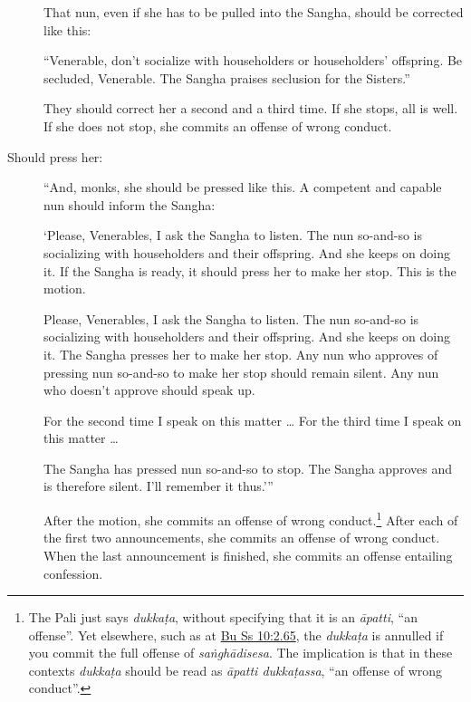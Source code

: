 \documentclass[12pt,openany]{book}%
\begin{document}
\begin{description}
That nun, even if she has to be pulled into the Sangha, should be corrected like this: 

“Venerable, don’t socialize with householders or householders’ offspring. Be secluded, Venerable. The Sangha praises seclusion for the Sisters.” 

They should correct her a second and a third time. If she stops, all is well. If she does not stop, she commits an offense of wrong conduct. 

%
\item[Should press her: ] “And, monks, she should be pressed like this. A competent and capable nun should inform the Sangha: 

‘Please, Venerables, I ask the Sangha to listen. The nun so-and-so is socializing with householders and their offspring. And she keeps on doing it. If the Sangha is ready, it should press her to make her stop. This is the motion. 

Please, Venerables, I ask the Sangha to listen. The nun so-and-so is socializing with householders and their offspring. And she keeps on doing it. The Sangha presses her to make her stop. Any nun who approves of pressing nun so-and-so to make her stop should remain silent. Any nun who doesn’t approve should speak up. 

For the second time I speak on this matter … For the third time I speak on this matter … 

The Sangha has pressed nun so-and-so to stop. The Sangha approves and is therefore silent. I’ll remember it thus.’” 

After the motion, she commits an offense of wrong conduct.\footnote{The Pali just says \textit{\textsanskrit{dukkaṭa}}, without specifying that it is an \textit{\textsanskrit{āpatti}}, “an offense”. Yet elsewhere, such as at \href{https://suttacentral.net/pli-tv-bu-vb-ss10/en/brahmali\#2.65}{Bu Ss 10:2.65}, the \textit{\textsanskrit{dukkaṭa}} is annulled if you commit the full offense of \textit{\textsanskrit{saṅghādisesa}}. The implication is that in these contexts \textit{\textsanskrit{dukkaṭa}} should be read as \textit{\textsanskrit{āpatti} \textsanskrit{dukkaṭassa}}, “an offense of wrong conduct”. } After each of the first two announcements, she commits an offense of wrong conduct. When the last announcement is finished, she commits an offense entailing confession. 

%
\end{description}
\end{document}

